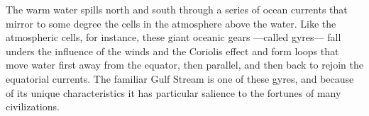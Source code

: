 The warm water spills north and south through a series of ocean currents
that mirror to some degree the cells in the atmosphere above the water.
Like the atmospheric cells, for instance, these giant oceanic gears
---called gyres--- fall unders the influence of the winds and the Coriolis
effect and form loops that move water first away from the equator, then
parallel, and then back to rejoin the equatorial currents. The familiar
Gulf Stream is one of these gyres, and because of its unique characteristics
it has particular salience to the fortunes of many civilizations.
